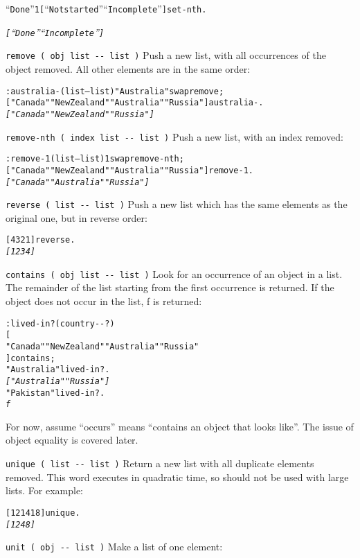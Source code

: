 \documentclass[english]{article}
\begin{document}
\begin{alltt}
{}``Done'' 1 {[} {}``Not started'' {}``Incomplete'' {]} set-nth .

\emph{{[} {}``Done'' {}``Incomplete'' {]}}
\end{alltt}
\texttt{remove ( obj list -{}- list )} Push a new list, with all occurrences
of the object removed. All other elements are in the same order:

\begin{alltt}
: australia- ( list -- list ) "Australia" swap remove ;
{[} "Canada" "New Zealand" "Australia" "Russia" {]} australia- .
\emph{{[} "Canada" "New Zealand" "Russia" {]}}
\end{alltt}
\texttt{remove-nth ( index list -{}- list )} Push a new list, with
an index removed:

\begin{alltt}
: remove-1 ( list -- list ) 1 swap remove-nth ;
{[} "Canada" "New Zealand" "Australia" "Russia" {]} remove-1 .
\emph{{[} "Canada" "Australia" "Russia" {]}}
\end{alltt}
\texttt{reverse ( list -{}- list )} Push a new list which has the
same elements as the original one, but in reverse order:

\begin{alltt}
{[} 4 3 2 1 {]} reverse .
\emph{{[} 1 2 3 4 {]}}
\end{alltt}
\texttt{contains ( obj list -{}- list )} Look for an occurrence of
an object in a list. The remainder of the list starting from the first
occurrence is returned. If the object does not occur in the list,
f is returned:

\begin{alltt}
: lived-in? ( country -{}- ? )
    {[}
        "Canada" "New Zealand" "Australia" "Russia"
    {]} contains ;
"Australia" lived-in? .
\emph{{[} "Australia" "Russia" {]}}
"Pakistan" lived-in? .
\emph{f}
\end{alltt}
For now, assume {}``occurs'' means {}``contains an object that
looks like''. The issue of object equality is covered later.

\texttt{unique ( list -{}- list )} Return a new list with all duplicate
elements removed. This word executes in quadratic time, so should
not be used with large lists. For example:

\begin{alltt}
{[} 1 2 1 4 1 8 {]} unique .
\emph{{[} 1 2 4 8 {]}}
\end{alltt}
\texttt{unit ( obj -{}- list )} Make a list of one element:
\end{document}
